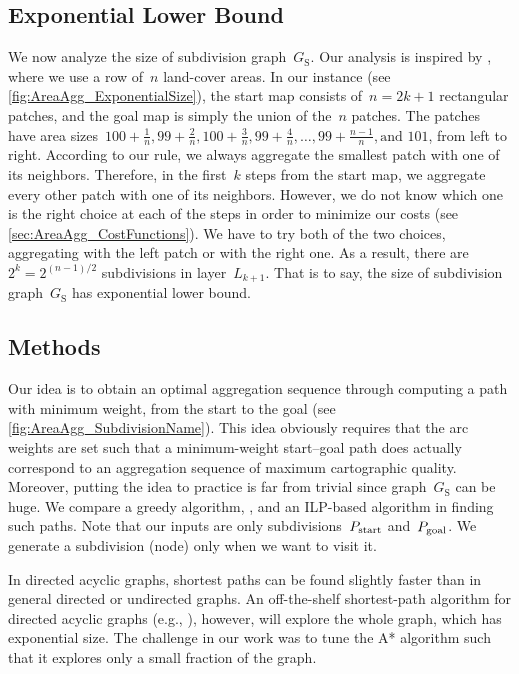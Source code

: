 \subsection{Exponential Lower Bound}
\label{sec:AreaAgg_Exponential}
We now analyze the size of subdivision graph~$G_\mathrm{S}$.
Our analysis is inspired by \textcite{Keane1975Size},
where we use a row of~$n$ land-cover areas.
In our instance
(see \fig\ref{fig:AreaAgg_ExponentialSize}), 
the start map consists of~$n=2k+1$ rectangular patches,
and the goal map is simply the union of the~$n$ patches.
The patches have area 
sizes~$
100 + \frac{1}{n}, 99+ \frac{2}{n}, 
100 + \frac{3}{n}, 99+ \frac{4}{n}, \ldots, 
99 + \frac{n-1}{n}, \text{and~} 101 
$, 
from left to right.
According to our rule, we always 
aggregate the smallest patch with one of its neighbors.
Therefore, in the first~$k$ steps from the start map,
we aggregate every other patch with one of its neighbors.
However, we do not know which one is the right choice
at each of the steps
in order to minimize our costs (see \sect\ref{sec:AreaAgg_CostFunctions}).
We have to try both of the two choices,
aggregating with the left patch or with the right one.
As a result, there are~$2^k = 2^{(n-1)/2}$ subdivisions 
in layer~$L_{k+1}$.
That is to say, the size of subdivision graph~$G_\mathrm{S}$
has exponential lower bound.


\subsection{Methods}
\label{sec:AreaAgg_Methods}

Our idea is to obtain an optimal aggregation sequence through 
computing a path with minimum weight, from the start to the goal 
(see \fig\ref{fig:AreaAgg_SubdivisionName}).
This idea obviously requires that the arc weights are 
set such that a minimum-weight start--goal
path does actually correspond to an aggregation sequence of 
maximum cartographic quality.  
Moreover, putting the idea to practice is far from trivial 
since graph~$G_\mathrm{S}$ can be huge.
We compare a greedy algorithm, \Astar, and an ILP-based algorithm
in finding such paths.
Note that our inputs are only
subdivisions~$P_\mathrm{start}$ and~$P_\mathrm{goal}$.
We generate a subdivision (node) only when we want to visit it.

In directed acyclic graphs, shortest paths can be found slightly faster 
than in general directed or undirected graphs.
An off-the-shelf shortest-path algorithm for directed acyclic graphs
(e.g., \textcite[]{Cormen2009}),
however, will explore the whole graph, which has exponential size.
The challenge in our work was to tune the A* algorithm such that it
explores only a small fraction of the graph.





